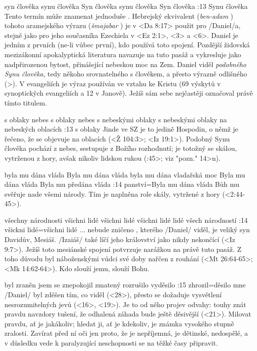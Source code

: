    {syn člověka}   %
   {synu člověka}   %
   {Syn člověka}   %
   {synu člověka}   %
   {Syn člověka}   %
:13 {Synu člověka} Tento termín může znamenat jednoduše . Hebrejský
   ekvivalent ({\it ben-adam\/} \BenAdam) tohoto aramejského výrazu ({\it šmajabar\/} \Shmajabar) je v <Da 8:17>  použit pro \x/Daniel/a, stejně jako pro jeho současníka Ezechiela v <Ez 2:1>, <3> a <6>. 
   Daniel je jedním z prvních (ne-li  vůbec první), kdo používá toto spojení.  Pozdější židovská mezizákonní apokalyptická
   literatura navazuje na tuto pasáž a vykresluje  jako nadpřirozenou bytost,
   přinášející nebeskou moc na Zem. Daniel viděl {\em podobného Synu člověka}, tedy někoho srovnatelného s člověkem, a přesto výrazně odlišného (>). V evangeliích  je výraz  používán ve vztahu ke Kristu (69 výskytů v synoptických evangeliích a 12 v Janově). Ježíš sám sebe nejčastěji označoval právě tímto titulem.

    {s oblaky nebes} %
    {s oblaky nebes}  %
    {s nebeskými oblaky} %
    {s nebeskými oblaky}  %
    {na nebeských oblacích}  %
:13 {s oblaky} Jinde ve SZ je to jedině Hospodin, o němž je řečeno, že se objevuje na oblacích  (<Ž 104:3>; <Iz 19:1>). Podobný Synu člověka pochází z nebes, sestupuje z Božího rozhodnutí; je totožný se skálou, vytrženou z hory, avšak nikoliv lidskou rukou  (:45>; viz \<"pozn." 14>n).

   {byla mu dána vláda}   %
   {Byla mu dána vláda}   %
   {byla mu dána vladařská moc}   %
   {Byla mu dána vláda}   %
   {Byla mu předána vláda}   %
:14 {panství}={Byla mu dána vláda} Bůh mu svěřuje  nade všemi národy. Tím je naplněna role skály, vytržené z hory (<2:44-45>).

   {všechny národnosti}   %
   {všichni lidé}   %
   {všichni lidé}   %
   {všichni lidé}   %
   {lidé všech národností}   %
:14 {všickni lidé}={všichni lidé ... nebude zničeno} , kterého \x/Daniel/ viděl, je veliký syn Davidův, Mesiáš. \x/Izaiáš/ také líčí jeho království jako nikdy nekončící  (<Iz 9:7>). Ježíš toto mesiánské spojení potvrzuje narážkou na právě tuto pasáž. Z toho důvodu byl náboženskými vůdci své doby nařčen z rouhání (<Mt 26:64-65>; <Mk 14:62-64>). Kdo slouží jemu, slouží Bohu.

   {byl zraněn}   %
   {jsem se znepokojil}   %
   {zmatený}   %
   {rozrušilo}   %
   {vyděsilo}   %
:15 {zhrozil}={děsilo mne} \x/Daniel/ byl zděšen tím, co viděl (<28>), přesto se dožaduje vysvětlení nesrozumitelných jevů (<16>, <19>). Je to od něho projev odvahy: touhy znát pravdu navzdory tušení, že odhalená záhada bude ještě děsivější (<21>). Milovat pravdu, ať je jakákoliv; hledat ji, ať je kdekoliv, je známka vysokého stupně zralosti. Zavírat před ní oči jen proto, že je nepříjemná, je dětinské, nedospělé, a v důsledku vede k paralyzující neschopnosti se na těžké časy připravit. 

